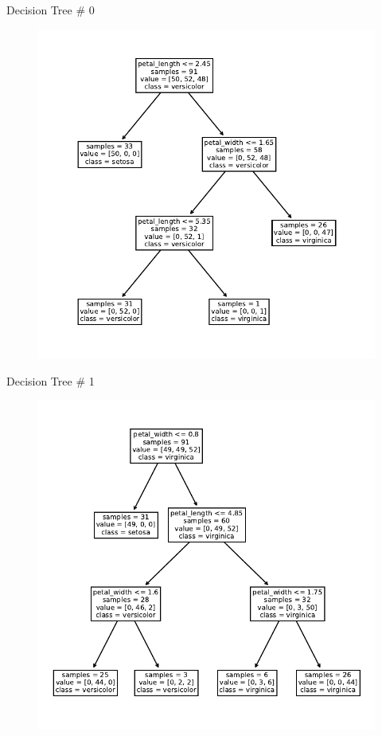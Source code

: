 \documentclass{beamer}
\begin{document}
\begin{frame}{Decision Tree \# 0}
\begin{figure}
	\includegraphics[scale=0.7]{tree-0.pdf}
\end{figure}
\end{frame}


\begin{frame}{Decision Tree \# 1}
\begin{figure}
\includegraphics[scale=0.7]{tree-1.pdf}
\end{figure}
\end{frame}
\end{document}

